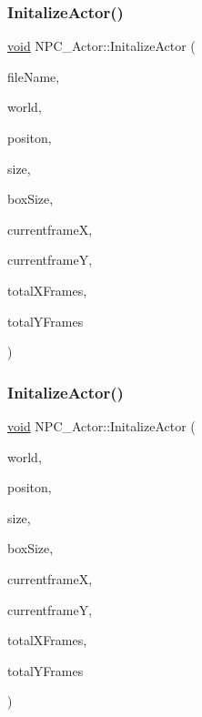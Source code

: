 \mbox{\label{classNPC__Actor_aee175ed98d287e0c15202d9db34ead24}} 
\subsubsection{\texorpdfstring{Initalize\+Actor()}{InitalizeActor()}\hspace{0.1cm}{\footnotesize\ttfamily [1/2]}}
{\footnotesize\ttfamily \hyperlink{imgui__impl__opengl3__loader_8h_ac668e7cffd9e2e9cfee428b9b2f34fa7}{void} N\+P\+C\+\_\+\+Actor\+::\+Initalize\+Actor (\begin{DoxyParamCaption}\item[{const char $\ast$}]{file\+Name,  }\item[{b2\+World $\ast$}]{world,  }\item[{glm\+::vec2}]{positon,  }\item[{glm\+::vec2}]{size,  }\item[{glm\+::vec2}]{box\+Size,  }\item[{int}]{currentframeX,  }\item[{int}]{currentframeY,  }\item[{int}]{total\+X\+Frames,  }\item[{int}]{total\+Y\+Frames }\end{DoxyParamCaption})}

\mbox{\label{classNPC__Actor_a4549d7c33e0e1fb711b1c2d42f651c00}} 
\subsubsection{\texorpdfstring{Initalize\+Actor()}{InitalizeActor()}\hspace{0.1cm}{\footnotesize\ttfamily [2/2]}}
{\footnotesize\ttfamily \hyperlink{imgui__impl__opengl3__loader_8h_ac668e7cffd9e2e9cfee428b9b2f34fa7}{void} N\+P\+C\+\_\+\+Actor\+::\+Initalize\+Actor (\begin{DoxyParamCaption}\item[{b2\+World $\ast$}]{world,  }\item[{glm\+::vec2}]{positon,  }\item[{glm\+::vec2}]{size,  }\item[{glm\+::vec2}]{box\+Size,  }\item[{int}]{currentframeX,  }\item[{int}]{currentframeY,  }\item[{int}]{total\+X\+Frames,  }\item[{int}]{total\+Y\+Frames }\end{DoxyParamCaption})}

